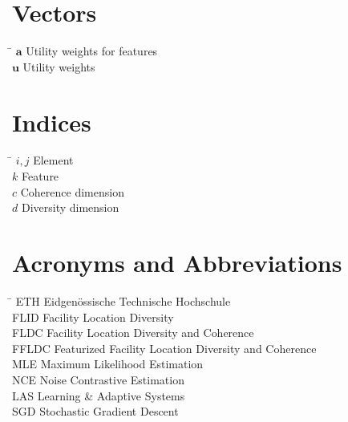 \section*{Vectors}

\begin{tabbing}
  \hspace*{1.6cm} \= \kill
  $\mathbf{a}$ \> Utility weights for features \\ [0.5ex]
  $\mathbf{u}$ \> Utility weights \\ [0.5ex]
\end{tabbing}

\section*{Indices}

\begin{tabbing}
  \hspace*{1.6cm} \= \kill
  $i, j$ \> Element \\ [0.5ex]
  $k$ \> Feature \\ [0.5ex]
  $c$ \> Coherence dimension \\ [0.5ex]
  $d$ \> Diversity dimension \\ [0.5ex]
\end{tabbing}

\section*{Acronyms and Abbreviations}
\begin{tabbing}
 \hspace*{1.6cm}  \= \kill
 ETH \> Eidgenössische Technische Hochschule \\[0.5ex]
 FLID \> Facility Location Diversity \\[0.5ex]
 FLDC \> Facility Location Diversity and Coherence \\[0.5ex]
 FFLDC \> Featurized Facility Location Diversity and Coherence \\ [0.5ex]
 MLE \> Maximum Likelihood Estimation \\ [0.5ex]
 NCE \> Noise Contrastive Estimation \\ [0.5ex]
 LAS \> Learning \& Adaptive Systems \\ [0.5ex]
 SGD \> Stochastic Gradient Descent \\ [0.5ex]

\end{tabbing}